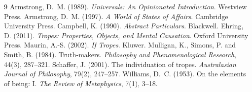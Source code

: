 \documentclass{situationist-preprint}
\begin{document}
\begin{thebibliography}{9}\small
{} Armstrong, D.~M. (1989). \emph{Universals: An Opinionated Introduction}. Westview Press.
 Armstrong, D.~M. (1997). \emph{A World of States of Affairs}. Cambridge University Press.
 Campbell, K. (1990). \emph{Abstract Particulars}. Blackwell.
 Ehring, D. (2011). \emph{Tropes: Properties, Objects, and Mental Causation}. Oxford University Press.
 Maurin, A.-S. (2002). \emph{If Tropes}. Kluwer.
 Mulligan, K., Simons, P. and Smith, B. (1984). Truth-makers. \emph{Philosophy and Phenomenological Research}, 44(3), 287--321.
 Schaffer, J. (2001). The individuation of tropes. \emph{Australasian Journal of Philosophy}, 79(2), 247--257.
 Williams, D.~C. (1953). On the elements of being: I. \emph{The Review of Metaphysics}, 7(1), 3--18.
\end{thebibliography}
\end{document}
